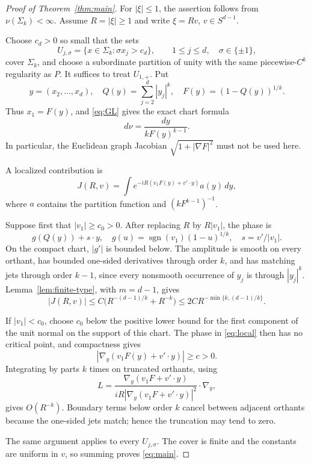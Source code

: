 \documentclass[11pt]{amsart}
\begin{document}
\begin{proof}[Proof of Theorem~\ref{thm:main}]
For \(|\xi|\le1\), the assertion follows from \(\nu(\Sigma_k)<\infty\).
Assume \(R=|\xi|\ge1\) and write \(\xi=Rv\), \(v\in S^{d-1}\).

Choose \(c_d>0\) so small that the sets
\[
U_{j,\sigma}=\{x\in\Sigma_k:\sigma x_j>c_d\},
\qquad 1\le j\le d,\quad \sigma\in\{\pm1\},
\]
cover \(\Sigma_k\), and choose a subordinate partition of unity with the
same piecewise-\(C^k\) regularity as \(P\).
It suffices to treat \(U_{1,+}\). Put
\[
y=(x_2,\ldots,x_d),\quad
Q(y)=\sum_{j=2}^d|y_j|^k,\quad F(y)=(1-Q(y))^{1/k}.
\]
Thus \(x_1=F(y)\), and \eqref{eq:GL} gives the exact chart formula
\begin{equation}\label{eq:GL-chart}
d\nu=\frac{dy}{kF(y)^{k-1}}.
\end{equation}
In particular, the Euclidean graph Jacobian
\(\sqrt{1+|\nabla F|^2}\) must not be used here.

A localized contribution is
\begin{equation}\label{eq:local}
J(R,v)=\int e^{-iR(v_1F(y)+v'\cdot y)}a(y)\,dy,
\end{equation}
where \(a\) contains the partition function and
\((kF^{k-1})^{-1}\).

Suppose first that \(|v_1|\ge c_0>0\). After replacing \(R\) by
\(R|v_1|\), the phase is
\[
g(Q(y))+s\cdot y,\quad
g(u)=\operatorname{sgn}(v_1)(1-u)^{1/k},\quad s=v'/|v_1|.
\]
On the compact chart, \(|g'|\) is bounded below. The amplitude is smooth
on every orthant, has bounded one-sided derivatives through order \(k\),
and has matching jets through order \(k-1\), since every nonsmooth
occurrence of \(y_j\) is through \(|y_j|^k\).
Lemma~\ref{lem:finite-type}, with \(m=d-1\), gives
\[
|J(R,v)|\le C\bigl(R^{-(d-1)/k}+R^{-k}\bigr)
\le2C R^{-\min\{k,(d-1)/k\}}.
\]

If \(|v_1|<c_0\), choose \(c_0\) below the positive lower bound for the
first component of the unit normal on the support of this chart. The phase
in \eqref{eq:local} then has no critical point, and compactness gives
\[
|\nabla_y(v_1F(y)+v'\cdot y)|\ge c>0.
\]
Integrating by parts \(k\) times on truncated orthants, using
\[
L=\frac{\nabla_y(v_1F+v'\cdot y)}
{iR|\nabla_y(v_1F+v'\cdot y)|^2}\cdot\nabla_y,
\]
gives \(O(R^{-k})\). Boundary terms below order \(k\) cancel between
adjacent orthants because the one-sided jets match; hence the truncation
may tend to zero.

The same argument applies to every \(U_{j,\sigma}\). The cover is finite
and the constants are uniform in \(v\), so summing proves
\eqref{eq:main}.
\end{proof}
\end{document}
